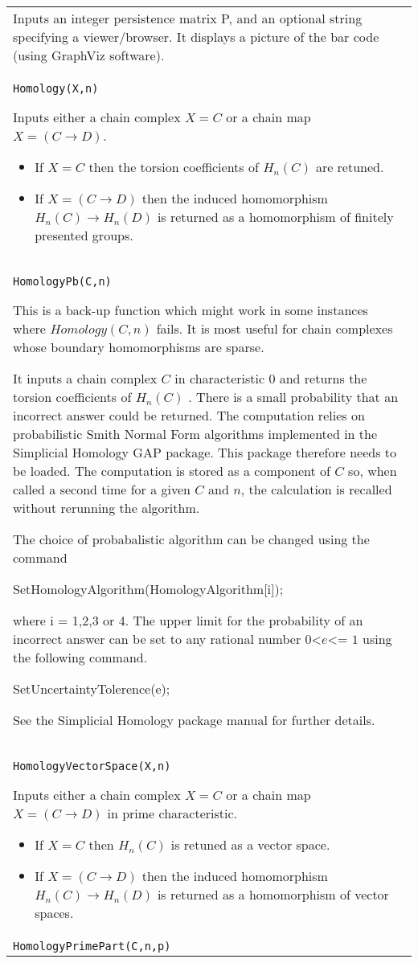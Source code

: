 \documentclass[a4paper,11pt]{report}
\begin{document}
{\begin{center}
\begin{tabular}{|l|}
 Inputs an integer persistence matrix P, and an optional string specifying a
viewer/browser. It displays a picture of the bar code (using GraphViz
software). \\
 \index{Homology} \texttt{Homology(X,n)} 

 Inputs either a chain complex $X=C$ or a chain map $X=(C \longrightarrow D)$. 
\begin{itemize}
\item If $X=C$ then the torsion coefficients of $H_n(C)$ are retuned.
\item  If $X=(C \longrightarrow D)$ then the induced homomorphism $H_n(C) \longrightarrow H_n(D)$ is returned as a homomorphism of finitely presented groups. 
\end{itemize}
 \\
 \index{HomologyPb} \texttt{HomologyPb(C,n)} 

 This is a back-up function which might work in some instances where $Homology(C,n)$ fails. It is most useful for chain complexes whose boundary homomorphisms are
sparse. 

 It inputs a chain complex $C$ in characteristic $0$ and returns the torsion coefficients of $H_n(C)$ . There is a small probability that an incorrect answer could be returned. The
computation relies on probabilistic Smith Normal Form algorithms implemented
in the Simplicial Homology GAP package. This package therefore needs to be
loaded. The computation is stored as a component of $C$ so, when called a second time for a given $C$ and $n$, the calculation is recalled without rerunning the algorithm. 

 The choice of probabalistic algorithm can be changed using the command 

 SetHomologyAlgorithm(HomologyAlgorithm[i]);

 where i = 1,2,3 or 4. The upper limit for the probability of an incorrect
answer can be set to any rational number $0${\textless}$e${\textless}= $1$ using the following command. 

SetUncertaintyTolerence(e);

 See the Simplicial Homology package manual for further details. \\
 \index{HomologyVectorSpace} \texttt{HomologyVectorSpace(X,n)} 

 Inputs either a chain complex $X=C$ or a chain map $X=(C \longrightarrow D)$ in prime characteristic. 
\begin{itemize}
\item If $X=C$ then $H_n(C)$ is retuned as a vector space.
\item  If $X=(C \longrightarrow D)$ then the induced homomorphism $H_n(C) \longrightarrow H_n(D)$ is returned as a homomorphism of vector spaces. 
\end{itemize}
 \\
 \index{HomologyPrimePart} \texttt{HomologyPrimePart(C,n,p)} 


\end{tabular}
\end{center}}
\end{document}

